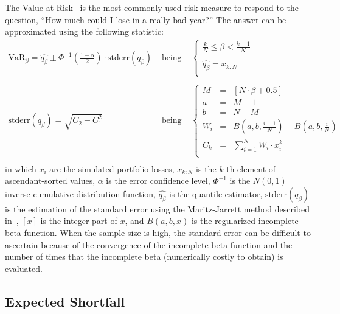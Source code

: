 \documentclass[11pt,fleqn]{book} %
\begin{document}
The Value at Risk~\cite{var:jorion} is the most commonly used risk measure 
to respond to the question, ``How much could I lose in a really bad year?''
The answer can be approximated using the following statistic:
\begin{displaymath}
	\begin{array}{lcl}
		\textrm{VaR}_{\beta} = \widehat{q_{\beta}} \pm \Phi^{-1}\left(\frac{1-\alpha}{2}\right) \cdot \textrm{stderr}(q_{\beta})
		& \text{ being } &
		\left\{
		\begin{array}{l}
			\displaystyle
			\frac{k}{N} \leq \beta < \frac{k+1}{N} \\
			\\
			\displaystyle
			\widehat{q_{\beta}} = x_{k:N} \\
		\end{array}
		\right.
		\\
		& &
		\\
		\textrm{stderr}(q_{\beta}) = \sqrt{C_2 - C_1^2}
		& \text{ being } &
		\left\{
		\begin{array}{rcl}
			M   & = & [N \cdot \beta + 0.5]  \\
			a   & = & M - 1            \\
			b   & = & N - M            \\
			W_i & = & B(a,b,\frac{i+1}{N}) - B(a,b,\frac{i}{N}) \\
			C_k & = & \sum_{i=1}^{N} W_i \cdot x_i^k \\
		\end{array}
		\right.
		\\
	\end{array}
\end{displaymath}
in which $x_i$ are the simulated portfolio losses, $x_{k:N}$ is the $k$-th 
element of ascendant-sorted values, $\alpha$ is the error confidence level, 
$\Phi^{-1}$ is the $N(0,1)$ inverse cumulative distribution function, 
$\widehat{q_{\beta}}$ is the quantile estimator, $\textrm{stderr}(q_{\beta})$ 
is the estimation of the standard error using the Maritz-Jarrett method 
described in~\cite[chap. 3.5.3]{wilcox:2004}, $[x]$ is the integer part of 
$x$, and $B(a,b,x)$ is the regularized incomplete beta function.
When the sample size is high, the standard error can be difficult to ascertain 
because of the convergence of the incomplete beta function and the number of 
times that the incomplete beta (numerically costly to obtain) is evaluated.

\subsection{Expected Shortfall}
\end{document}
